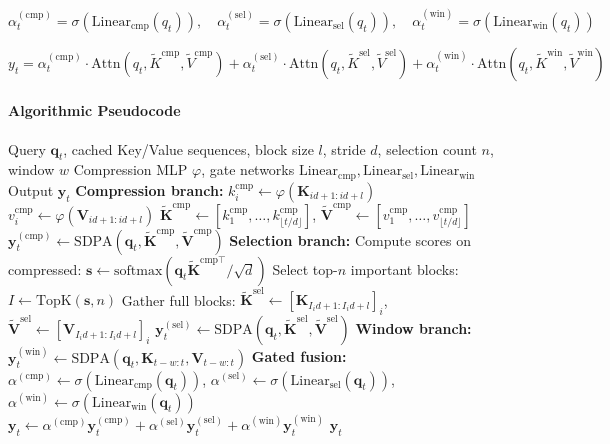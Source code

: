 \[
\alpha_t^{(\text{cmp})} = \sigma(\text{Linear}_\text{cmp}(q_t)), \quad \alpha_t^{(\text{sel})} = \sigma(\text{Linear}_\text{sel}(q_t)), \quad \alpha_t^{(\text{win})} = \sigma(\text{Linear}_\text{win}(q_t))
\]

\[
y_t = \alpha_t^{(\text{cmp})} \cdot \text{Attn}(q_t, \tilde{K}^{\text{cmp}}, \tilde{V}^{\text{cmp}}) + \alpha_t^{(\text{sel})} \cdot \text{Attn}(q_t, \tilde{K}^{\text{sel}}, \tilde{V}^{\text{sel}}) + \alpha_t^{(\text{win})} \cdot \text{Attn}(q_t, \tilde{K}^{\text{win}}, \tilde{V}^{\text{win}})
\]

\paragraph{Algorithmic Pseudocode}

\begin{algorithm}[H]
\caption{NSA: Compressed + Selected + Window Branches with Learned Gating}
\begin{algorithmic}[1]
\Require Query $\mathbf{q}_t$, cached Key/Value sequences, block size $l$, stride $d$, selection count $n$, window $w$
\Require Compression MLP $\varphi$, gate networks $\text{Linear}_{\text{cmp}}, \text{Linear}_{\text{sel}}, \text{Linear}_{\text{win}}$
\Ensure Output $\mathbf{y}_t$
\State \textbf{Compression branch:}
    \State $k_i^{\text{cmp}} \gets \varphi(\mathbf{K}_{id+1:id+l})$ 
    \State $v_i^{\text{cmp}} \gets \varphi(\mathbf{V}_{id+1:id+l})$
\EndFor
\State $\tilde{\mathbf{K}}^{\text{cmp}} \gets [k_1^{\text{cmp}}, \ldots, k_{\lfloor t/d \rfloor}^{\text{cmp}}]$, $\tilde{\mathbf{V}}^{\text{cmp}} \gets [v_1^{\text{cmp}}, \ldots, v_{\lfloor t/d \rfloor}^{\text{cmp}}]$
\State $\mathbf{y}_t^{(\text{cmp})} \gets \text{SDPA}(\mathbf{q}_t, \tilde{\mathbf{K}}^{\text{cmp}}, \tilde{\mathbf{V}}^{\text{cmp}})$
\State \textbf{Selection branch:}
\State Compute scores on compressed: $\mathbf{s} \gets \text{softmax}(\mathbf{q}_t \tilde{\mathbf{K}}^{\text{cmp}\top} / \sqrt{d})$
\State Select top-$n$ important blocks: $I \gets \mathrm{TopK}(\mathbf{s}, n)$
\State Gather full blocks: $\tilde{\mathbf{K}}^{\text{sel}} \gets [\mathbf{K}_{I_i d+1:I_i d+l}]_i$, $\tilde{\mathbf{V}}^{\text{sel}} \gets [\mathbf{V}_{I_i d+1:I_i d+l}]_i$
\State $\mathbf{y}_t^{(\text{sel})} \gets \text{SDPA}(\mathbf{q}_t, \tilde{\mathbf{K}}^{\text{sel}}, \tilde{\mathbf{V}}^{\text{sel}})$
\State \textbf{Window branch:}
\State $\mathbf{y}_t^{(\text{win})} \gets \text{SDPA}(\mathbf{q}_t, \mathbf{K}_{t-w:t}, \mathbf{V}_{t-w:t})$
\State \textbf{Gated fusion:}
\State $\alpha^{(\text{cmp})} \gets \sigma(\text{Linear}_{\text{cmp}}(\mathbf{q}_t))$, $\alpha^{(\text{sel})} \gets \sigma(\text{Linear}_{\text{sel}}(\mathbf{q}_t))$, $\alpha^{(\text{win})} \gets \sigma(\text{Linear}_{\text{win}}(\mathbf{q}_t))$
\State $\mathbf{y}_t \gets \alpha^{(\text{cmp})} \mathbf{y}_t^{(\text{cmp})} + \alpha^{(\text{sel})} \mathbf{y}_t^{(\text{sel})} + \alpha^{(\text{win})} \mathbf{y}_t^{(\text{win})}$
\Return $\mathbf{y}_t$
\end{algorithmic}
\end{algorithm}

